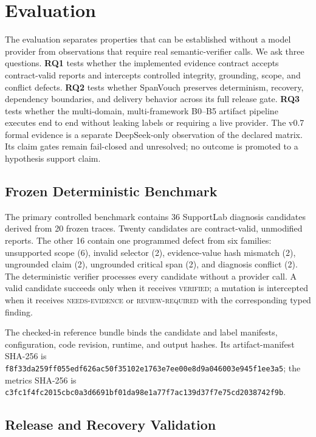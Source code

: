\section{Evaluation}
\label{sec:experiments}

The evaluation separates properties that can be established without a model
provider from observations that require real semantic-verifier calls. We ask
three questions. \textbf{RQ1} tests whether the implemented evidence contract
accepts contract-valid reports and intercepts controlled integrity, grounding,
scope, and conflict defects. \textbf{RQ2} tests whether SpanVouch preserves
determinism, recovery, dependency boundaries, and delivery behavior across its
full release gate. \textbf{RQ3} tests whether the multi-domain,
multi-framework B0--B5 artifact pipeline executes end to end without leaking
labels or requiring a live provider. The v0.7 formal evidence is a separate
DeepSeek-only observation of the declared matrix. Its claim gates remain
fail-closed and unresolved; no outcome is promoted to a hypothesis support
claim.

\subsection{Frozen Deterministic Benchmark}

The primary controlled benchmark contains 36 SupportLab diagnosis candidates
derived from 20 frozen traces. Twenty candidates are contract-valid,
unmodified reports. The other 16 contain one programmed defect from six
families: unsupported scope (6), invalid selector (2), evidence-value hash
mismatch (2), ungrounded claim (2), ungrounded critical span (2), and diagnosis
conflict (2). The deterministic verifier processes every candidate without a
provider call. A valid candidate succeeds only when it receives
\textsc{verified}; a mutation is intercepted when it receives
\textsc{needs-evidence} or \textsc{review-required} with the corresponding
typed finding.

The checked-in reference bundle binds the candidate and label manifests,
configuration, code revision, runtime, and output hashes. Its artifact-manifest
SHA-256 is
\nolinkurl{f8f33da259ff055edf626ac50f35102e1763e7ee00e8d9a046003e945f1ee3a5};
the metrics SHA-256 is
\nolinkurl{c3fc1f4fc2015cbc0a3d6691bf01da98e1a77f7ac139d37f7e75cd2038742f9b}.

\subsection{Release and Recovery Validation}

